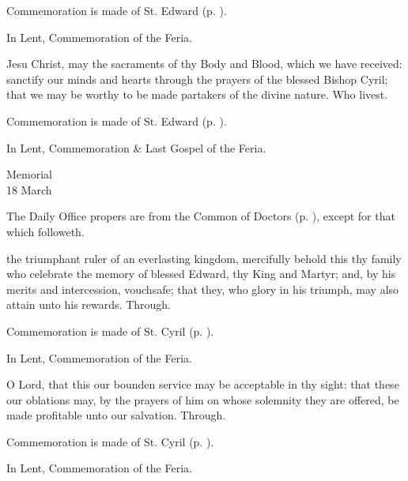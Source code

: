 \begin{rubric}
	Commemoration is made of St. Edward (p. \pageref{EdwardSecret}).
\end{rubric}
\begin{rubric}
	In Lent, Commemoration of the Feria.
\end{rubric}


\postcommunion\label{CyrilPostcommunion}
 Jesu Christ, may the sacraments of thy Body and Blood, which we have received: sanctify our minds and hearts through the prayers of the blessed Bishop Cyril; that we may be worthy to be made partakers of the divine nature. Who livest.

\begin{rubric}
	Commemoration is made of St. Edward (p. \pageref{EdwardPostcommunion}).
\end{rubric}
\begin{rubric}
	In Lent, Commemoration \& Last Gospel of the Feria.
\end{rubric}


\begin{inhead}
    {Memorial\\
18 March}
\end{inhead}

\begin{rubric}
	The Daily Office propers are from the Common of Doctors (p. \pageref{CommonDoctors}), except for that which followeth.
\end{rubric}

\collect\label{EdwardCollect}
 the triumphant ruler of an everlasting kingdom, mercifully behold this thy family who celebrate the memory of blessed Edward, thy King and Martyr; and, by his merits and intercession, vouchsafe; that they, who glory in his triumph, may also attain unto his rewards. Through.

\begin{rubric}
	Commemoration is made of St. Cyril (p. \pageref{CyrilCollect}).
\end{rubric}
\begin{rubric}
	In Lent, Commemoration of the Feria.
\end{rubric}

\secret\label{EdwardSecret}
 O Lord, that this our bounden service may be acceptable in thy sight: that these our oblations may, by the prayers of him on whose solemnity they are offered, be made profitable unto our salvation. Through.
\begin{rubric}
	Commemoration is made of St. Cyril (p. \pageref{CyrilSecret}).
\end{rubric}
\begin{rubric}
	In Lent, Commemoration of the Feria.
\end{rubric}

